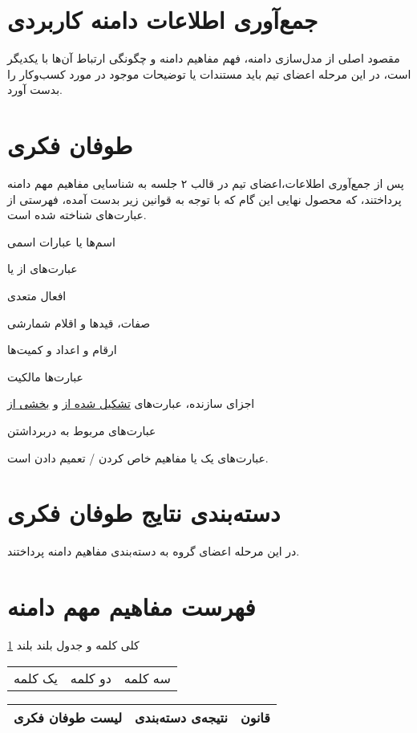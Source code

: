 \documentclass[12pt,svgnames,oneside]{book}
\newcounter{itemadded}
\let\LaTeXStandardEnumerateBegin\enumerate
\let\LaTeXStandardEnumerateEnd\endenumerate
\renewenvironment{enumerate}{%
\LaTeXStandardEnumerateBegin%
\setcounter{itemadded}{0}
}{%
\LaTeXStandardEnumerateEnd%
}%
\begin{document}
\section{جمع‌آوری اطلاعات دامنه کاربردی}
مقصود اصلی از مدل‌سازی دامنه، فهم مفاهیم دامنه و چگونگی ارتباط آن‌ها با یکدیگر است، در این مرحله اعضای تیم باید مستندات یا توضیحات موجود در مورد کسب‌و‌کار را بدست آورد.
\section{طوفان فکری}
پس از جمع‌آوری اطلاعات،‌اعضای تیم در قالب ۲ جلسه به شناسایی مفاهیم مهم دامنه پرداختند، که محصول نهایی این گام که با توجه به قوانین زیر بدست آمده، فهرستی از عبارت‌های شناخته شده است.
\begin{enumerate}
\item
اسم‌‌ها یا عبارات اسمی
\item
عبارت‌های
 از 
یا
\item
افعال متعدی
\item
صفات، قید‌‌ها و اقلام شمارشی
\item
ارقام و اعداد و کمیت‌ها
\item
عبارت‌ها مالکیت
\item
اجزای سازنده، عبارت‌های
\underline{تشکیل شده از} و
\underline{بخشی از}
\item
عبارت‌های مربوط به دربرداشتن
\item
عبارت‌های
یک
یا مفاهیم خاص کردن / تعمیم دادن است.
\end{enumerate}

\section{دسته‌بندی نتایج طوفان فکری}
در این مرحله اعضای گروه به دسته‌بندی مفاهیم دامنه پرداختند.

\section{فهرست مفاهیم مهم دامنه}
کلی کلمه و جدول بلند بلند \ref{table:domain}

\begin{longtable}{ccc}
یک کلمه
\footnotemark[2] &
دو کلمه
\footnotemark[10]&
سه کلمه 
\footnotemark \\
\end{longtable}

\begin{table}[H]
\caption{مفاهیم مهم دامنه}
\begin{longtable}{|c|c|c|}
\hline
لیست طوفان فکری &
نتیجه‌ی دسته‌بندی &
قانون \\
\hline
\end{longtable}
\label{table:domain}
\end{table}
\end{document}
